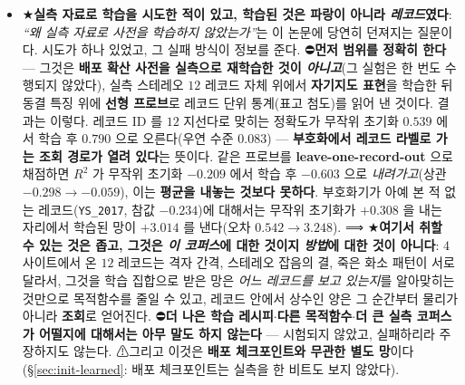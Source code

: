 \documentclass[11pt]{report}
\numberwithin{equation}{chapter}
\numberwithin{figure}{chapter}
\numberwithin{table}{chapter}
\begin{document}
\begin{itemize}
  \item ★\textbf{실측 자료로 학습을 시도한 적이 있고, 학습된 것은 파랑이 아니라
        \emph{레코드}였다}: \emph{``왜 실측 자료로 사전을 학습하지 않았는가''}는 이 논문에
        당연히 던져지는 질문이다. 시도가 하나 있었고, 그 실패 방식이 정보를 준다.
        ⛔\textbf{먼저 범위를 정확히 한다} --- 그것은 \textbf{배포 확산 사전을 실측으로
        재학습한 것이 \emph{아니고}}(그 실험은 한 번도 수행되지 않았다), 실측 스테레오
        $12$ 레코드 자체 위에서 \textbf{자기지도 표현}을 학습한 뒤 동결 특징 위에
        \textbf{선형 프로브}로 레코드 단위 통계(표고 첨도)를 읽어 낸 것이다.
        결과는 이렇다. 레코드 ID 를 $12$ 지선다로 맞히는 정확도가 무작위 초기화
        $0.539$ 에서 학습 후 $\mathbf{0.790}$ 으로 오른다(우연 수준 $0.083$)
        --- \textbf{부호화에서 레코드 라벨로 가는 조회 경로가 열려 있다}는 뜻이다.
        같은 프로브를 \textbf{leave-one-record-out} 으로 채점하면
        $R^2$ 가 무작위 초기화 $-0.209$ 에서 학습 후 $\mathbf{-0.603}$ 으로
        \emph{내려가고}(상관 $-0.298 \to -0.059$), 이는 \textbf{평균을 내놓는 것보다
        못하다}. 부호화기가 아예 본 적 없는 레코드(\texttt{YS\_2017}, 참값 $-0.234$)에
        대해서는 무작위 초기화가 $+0.308$ 을 내는 자리에서 학습된 망이
        $\mathbf{+3.014}$ 를 낸다(오차 $0.542 \to 3.248$).
        ⟹ ★\textbf{여기서 취할 수 있는 것은 좁고, 그것은 \emph{이 코퍼스}에 대한 것이지
        \emph{방법}에 대한 것이 아니다}: $4$ 사이트에서 온 $12$ 레코드는 격자 간격,
        스테레오 잡음의 결, 죽은 화소 패턴이 서로 달라서, 그것을 학습 집합으로 받은 망은
        \emph{어느 레코드를 보고 있는지}를 알아맞히는 것만으로 목적함수를 줄일 수 있고,
        레코드 안에서 상수인 양은 그 순간부터 물리가 아니라 \textbf{조회}로 얻어진다.
        ⛔\textbf{더 나은 학습 레시피$\cdot$다른 목적함수$\cdot$더 큰 실측 코퍼스가 어떨지에
        대해서는 아무 말도 하지 않는다} --- 시험되지 않았고, 실패하리라 주장하지도 않는다.
        ⚠그리고 이것은 \textbf{배포 체크포인트와 무관한 별도 망}이다
        (\S\ref{sec:init-learned}: 배포 체크포인트는 실측을 한 비트도 보지 않았다).

\end{itemize}
\end{document}

